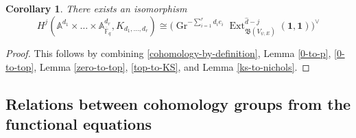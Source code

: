 \documentclass[11pt,letterpaper]{article}
\newtheorem{corollary}[theorem]{Corollary}
\theoremstyle{definition}
\theoremstyle{remark}
\numberwithin{equation}{section}
\theoremstyle{dotless}
\newcommand{\Gr}{\operatorname{Gr}}
\newcommand{\hchi}{\psi} %
\begin{document}
\begin{corollary}\label{K-to-nichols}There exists an isomorphism
\[ H^j( \mathbb A^{d_1 }\times  \dots \times \mathbb A^{ d_r }_{\overline{\mathbb F}_q}, K_{d_1,\dots, d_r}) \cong   \Biggl(  \Gr^{ -\sum_{i=1}^r d_i e_i}  \operatorname{Ext}^{\hat{d}-j } _{ \mathfrak B( V_{\hchi,E} )} (\mathbf 1, \mathbf 1)  \Biggr)^\vee\]
\end{corollary}

\begin{proof}
    This follows by combining \eqref{cohomology-by-definition}, Lemma \ref{0-to-p}, \eqref{0-to-top}, Lemma \ref{zero-to-top}, \eqref{top-to-KS}, and Lemma \ref{ks-to-nichols}.
\end{proof}

\subsection{Relations between cohomology groups from the functional equations}\label{ss:dimensions-cohomology} 
\end{document}
